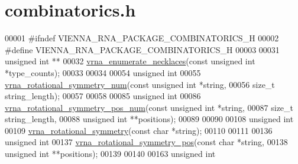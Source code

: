 \hypertarget{combinatorics_8h_source}{}\section{combinatorics.\+h}
\label{combinatorics_8h_source}

\begin{DoxyCode}
00001 \textcolor{preprocessor}{#ifndef VIENNA\_RNA\_PACKAGE\_COMBINATORICS\_H}
00002 \textcolor{preprocessor}{#define VIENNA\_RNA\_PACKAGE\_COMBINATORICS\_H}
00003 
00031 \textcolor{keywordtype}{unsigned} \textcolor{keywordtype}{int} **
00032 \hyperlink{group__combinatorics__utils_gae081ac655a76bd5c4b3d86c60b096b75}{vrna\_enumerate\_necklaces}(\textcolor{keyword}{const} \textcolor{keywordtype}{unsigned} \textcolor{keywordtype}{int} *type\_counts);
00033 
00034 
00054 \textcolor{keywordtype}{unsigned} \textcolor{keywordtype}{int}
00055 \hyperlink{group__combinatorics__utils_gac51464b5281833a58c25f9447252c495}{vrna\_rotational\_symmetry\_num}(\textcolor{keyword}{const} \textcolor{keywordtype}{unsigned} \textcolor{keywordtype}{int} *\textcolor{keywordtype}{string},
00056                              \textcolor{keywordtype}{size\_t}             string\_length);
00057 
00058 
00085 \textcolor{keywordtype}{unsigned} \textcolor{keywordtype}{int}
00086 \hyperlink{group__combinatorics__utils_ga95b5a6ac35da982e2a766f8d2f98a2e1}{vrna\_rotational\_symmetry\_pos\_num}(\textcolor{keyword}{const} \textcolor{keywordtype}{unsigned} \textcolor{keywordtype}{int} *\textcolor{keywordtype}{string},
00087                                  \textcolor{keywordtype}{size\_t}             string\_length,
00088                                  \textcolor{keywordtype}{unsigned} \textcolor{keywordtype}{int}       **positions);
00089 
00090 
00108 \textcolor{keywordtype}{unsigned} \textcolor{keywordtype}{int}
00109 \hyperlink{group__combinatorics__utils_gae1dec02c4b63f303ce06a9293d316762}{vrna\_rotational\_symmetry}(\textcolor{keyword}{const} \textcolor{keywordtype}{char} *\textcolor{keywordtype}{string});
00110 
00111 
00136 \textcolor{keywordtype}{unsigned} \textcolor{keywordtype}{int}
00137 \hyperlink{group__combinatorics__utils_ga294d48935fcac87ab335d771fe289ecb}{vrna\_rotational\_symmetry\_pos}(\textcolor{keyword}{const} \textcolor{keywordtype}{char}   *\textcolor{keywordtype}{string},
00138                              \textcolor{keywordtype}{unsigned} \textcolor{keywordtype}{int} **positions);
00139 
00140 
00163 \textcolor{keywordtype}{unsigned} \textcolor{keywordtype}{int}

\end{DoxyCode}
